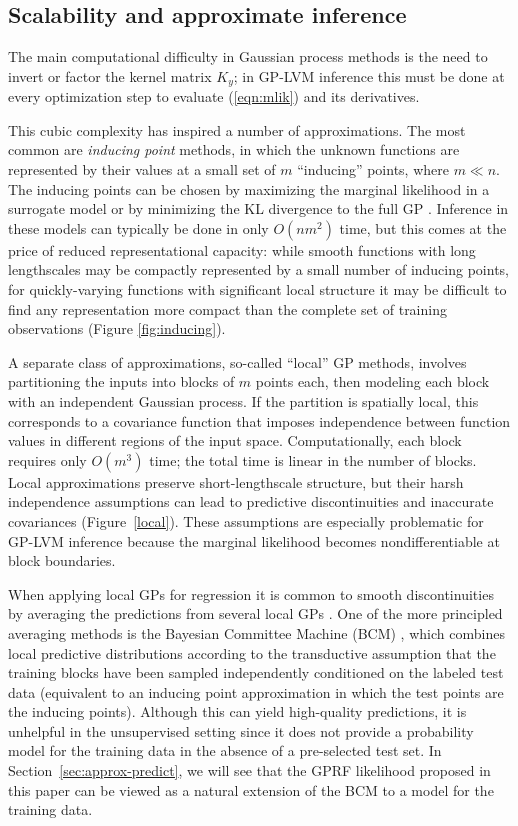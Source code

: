 \documentclass{article}
\begin{document}
\subsection{Scalability and approximate inference}
\label{sec:approx}

The main computational difficulty in Gaussian process methods is
the need to invert or factor the kernel matrix $K_y$; in GP-LVM inference
this must be done at every optimization step to evaluate
(\ref{eqn:mlik}) and its derivatives.

This cubic complexity has inspired
a number of approximations. The most common are {\em inducing point} methods, in which the unknown functions are
represented by their values at a small set of $m$ ``inducing''
points, where $m \ll n$. The inducing points can be chosen by maximizing the marginal
likelihood in a surrogate model \citep{ftic, inducing_gplvm} or by
minimizing the KL divergence to the full GP \citep{titsias,
  gplvm_variational}. Inference in these models can typically be done in only $O(nm^2)$ time, but this comes at the price of reduced
representational capacity: while smooth functions with long lengthscales may
be compactly represented by a small number of inducing points, for
quickly-varying functions with significant local
structure it may be difficult to find any representation more compact
than the complete set of training observations (Figure \ref{fig:inducing}).

A separate class of approximations, so-called ``local'' GP methods, involves
partitioning the inputs into blocks of $m$ points each, then modeling
each block with an independent Gaussian process. If the partition is
spatially local, this corresponds to a covariance function that imposes independence
between function values in different regions of the input
space. Computationally, each block requires only $O(m^3)$ time; the
total time is linear in the number of blocks. Local approximations
preserve short-lengthscale structure, but their harsh independence assumptions can lead to
predictive discontinuities and inaccurate covariances
(Figure~\ref{local}). These assumptions are especially problematic for
GP-LVM inference because the marginal likelihood becomes
nondifferentiable at block boundaries.

When applying local GPs for regression it is common to smooth
discontinuities by averaging the
predictions from several local GPs \cite{stuff, stuff}. One of the
more principled averaging methods is the Bayesian Committee Machine (BCM) \cite{bcm}, which
combines local predictive distributions according to the
transductive assumption that the training blocks have been sampled
independently conditioned on the labeled test data (equivalent
to an inducing point approximation in which the test points are the
inducing points). Although this can yield high-quality predictions, it
is unhelpful in the unsupervised setting since it does not provide a
probability model for the training data in the absence of a pre-selected
test set. In
Section~\ref{sec:approx-predict}, we will see that the GPRF
likelihood proposed in this paper can be viewed as a natural extension
of the BCM to a model for the training data.
\end{document}
